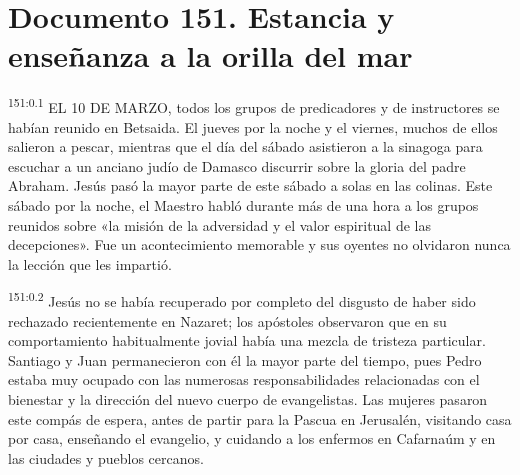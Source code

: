 \chapter{Documento 151. Estancia y enseñanza a la orilla del mar}
\par 
\textsuperscript{151:0.1} EL 10 DE MARZO, todos los grupos de predicadores y de instructores se habían reunido en Betsaida. El jueves por la noche y el viernes, muchos de ellos salieron a pescar, mientras que el día del sábado asistieron a la sinagoga para escuchar a un anciano judío de Damasco discurrir sobre la gloria del padre Abraham. Jesús pasó la mayor parte de este sábado a solas en las colinas. Este sábado por la noche, el Maestro habló durante más de una hora a los grupos reunidos sobre «la misión de la adversidad y el valor espiritual de las decepciones». Fue un acontecimiento memorable y sus oyentes no olvidaron nunca la lección que les impartió.

\par 
\textsuperscript{151:0.2} Jesús no se había recuperado por completo del disgusto de haber sido rechazado recientemente en Nazaret; los apóstoles observaron que en su comportamiento habitualmente jovial había una mezcla de tristeza particular. Santiago y Juan permanecieron con él la mayor parte del tiempo, pues Pedro estaba muy ocupado con las numerosas responsabilidades relacionadas con el bienestar y la dirección del nuevo cuerpo de evangelistas. Las mujeres pasaron este compás de espera, antes de partir para la Pascua en Jerusalén, visitando casa por casa, enseñando el evangelio, y cuidando a los enfermos en Cafarnaúm y en las ciudades y pueblos cercanos.

